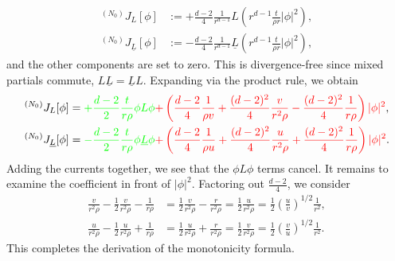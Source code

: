 	\begin{align*}
		{^{(N_0)}} J_L [\phi]
			&:= + \frac{d - 2}{4} \frac{1}{r^{d - 1}} L \left( r^{d - 1} \frac{t}{\rho r} |\phi|^2 \right) ,
			\\
		{^{(N_0)}} J_{\underline L} [\phi]
			&:=  -\frac{d - 2}{4} \frac{1}{r^{d - 1}} \underline L \left( r^{d - 1}\frac{t}{\rho r} |\phi|^2 \right)	,
	\end{align*}
and the other components are set to zero. This is divergence-free since mixed partials commute, $L \underline L = \underline L L$. Expanding via the product rule, we obtain
	\begin{align*}
		{^{(N_0)}} J_L [\phi]
			&= {\color{green}+\frac{d - 2}{2} \frac{t}{r \rho}  \phi L \phi } 
			{\color{red}+
			\left(\frac{d - 2}{4} \frac{1}{\rho v} + \frac{(d - 2)^2}{4} \frac{v}{r^2 \rho} - \frac{(d - 2)^2}{4} \frac{1}{r \rho}\right) |\phi|^2},
			\\
		{^{(N_0)}} J_{\underline L} [\phi]
			&= {\color{green} -\frac{d - 2}{2} \frac{t}{r \rho}  \phi \underline L  \phi } {\color{red}+
			\left(\frac{d - 2}{4} \frac{1}{\rho u} + \frac{(d - 2)^2}{4} \frac{u}{r^2 \rho}  + \frac{(d - 2)^2}{4} \frac{1}{r \rho}\right) |\phi|^2}.
	\end{align*}
Adding the currents together, we see that the $ \phi L \phi $ terms cancel. It remains to examine the coefficient in front of $|\phi|^2$. Factoring out $\tfrac{d - 2}{4}$, we consider
	\begin{align*}
		\frac{v}{r^2 \rho} -\frac12 \frac{v}{r^2 \rho} -  \frac{1}{r \rho}
			&= \frac12 \frac{v}{r^2 \rho} -  \frac{r}{r^2 \rho} = \frac12 \frac{u}{r^2 \rho} = \frac12 \left( \frac{u}{v} \right)^{1/2} \frac{1}{r^2}, \\
		\frac{u}{r^2 \rho} -\frac12 \frac{u}{r^2 \rho} +  \frac{1}{r \rho}
			&= \frac12 \frac{u}{r^2 \rho} +  \frac{r}{r^2 \rho} = \frac12 \frac{v}{r^2 \rho} = \frac12 \left( \frac{v}{u} \right)^{1/2} \frac{1}{r^2}.	
	\end{align*}
This completes the derivation of the monotonicity formula.

